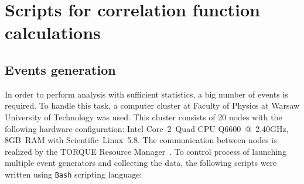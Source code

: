 %
\chapter[Correlation function calculation scripts]{Scripts for correlation function calculations}
\label{a:a}
  \section{Events generation}
    In order to perform analysis with sufficient statistics, a big number of events is required.
    To handle this task, a computer cluster at Faculty of Physics at Warsaw University of Technology was used.
    This cluster consists of 20 nodes with the following hardware configuration: \mbox{Intel\textregistered} \mbox{Core\texttrademark~2 Quad} CPU \mbox{Q6600 @ 2.40GHz,} \mbox{8GB RAM} with Scientific~Linux~5.8.
    The communication between nodes is realized by the TORQUE Resource Manager~\cite{torque}.
    To control process of launching multiple event generators and collecting the data, the following scripts were written using \verb|Bash| scripting language:
